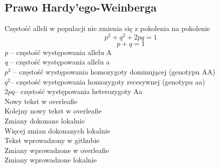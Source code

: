 \begin{flushleft}
\subsection{Prawo Hardy’ego-Weinberga }
 Częstość alleli w populacji nie zmienia się z pokolenia na pokolenie
\[p^2 + q^2 +2pq =1\]
\[p + q = 1\]
\textit{p} – częstość występowania allelu A\\
\textit{q} – częstość występowania allelu a\\
$p^2$ – częstość występowania homozygoty dominującej (genotypu AA)\\
$q^2$– częstość występowania homozygoty recesywnej (genotypu aa)\\
$2pq$– częstość występowania heterozygoty Aa\\

Nowy tekst w overleafie\\
Kolejny nowy tekst w overleafie\\
Zmiany dokonane lokalnie\\
Więcej zmian dokonanych lokalnie\\
Tekst wprowadzony w githubie\\
Zmiany wprowadzone w overleafie\\
Zmiany wprowadzone lokalnie\\
\end{flushleft}

